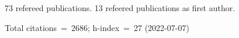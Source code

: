 73 refereed publications. 13 refeered publications as first author.

Total citations~=~2686; h-index~=~27 (2022-07-07)